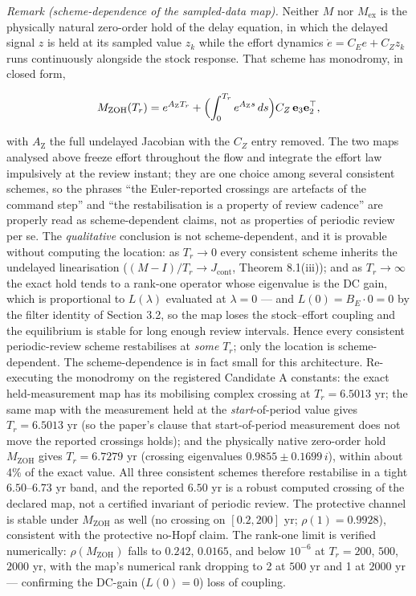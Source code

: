 \documentclass[11pt]{article}
\begin{document}
\emph{Remark (scheme-dependence of the sampled-data map).} Neither \(M\)
nor \(M_{\mathrm{ex}}\) is the physically natural zero-order hold of the
delay equation, in which the delayed signal \(z\) is held at its sampled
value \(z_k\) while the effort dynamics \(\dot e = C_E e + C_Z z_k\)
runs continuously alongside the stock response. That scheme has
monodromy, in closed form,

\[M_{\mathrm{ZOH}}(T_r) = e^{A_{\mathrm{Z}} T_r} + \Bigl( \int_0^{T_r} e^{A_{\mathrm{Z}} s}\, ds \Bigr) C_Z\, \mathbf e_3 \mathbf e_2^\top,\]

with \(A_{\mathrm{Z}}\) the full undelayed Jacobian with the \(C_Z\)
entry removed. The two maps analysed above freeze effort throughout the
flow and integrate the effort law impulsively at the review instant;
they are one choice among several consistent schemes, so the phrases
``the Euler-reported crossings are artefacts of the command step'' and
``the restabilisation is a property of review cadence'' are properly
read as scheme-dependent claims, not as properties of periodic review
per se. The \emph{qualitative} conclusion is not scheme-dependent, and
it is provable without computing the location: as \(T_r \to 0\) every
consistent scheme inherits the undelayed linearisation
(\((M - I)/T_r \to J_{\mathrm{cont}}\), Theorem 8.1(iii)); and as
\(T_r \to \infty\) the exact hold tends to a rank-one operator whose
eigenvalue is the DC gain, which is proportional to \(L(\lambda)\)
evaluated at \(\lambda = 0\) --- and \(L(0) = B_E \cdot 0 = 0\) by the
filter identity of Section 3.2, so the map loses the stock--effort
coupling and the equilibrium is stable for long enough review intervals.
Hence every consistent periodic-review scheme restabilises at
\emph{some} \(T_r\); only the location is scheme-dependent. The
scheme-dependence is in fact small for this architecture. Re-executing
the monodromy on the registered Candidate A constants: the exact
held-measurement map has its mobilising complex crossing at
\(T_r = 6.5013\) yr; the same map with the measurement held at the
\emph{start}-of-period value gives \(T_r = 6.5013\) yr (so the paper's
clause that start-of-period measurement does not move the reported
crossings holds); and the physically native zero-order hold
\(M_{\mathrm{ZOH}}\) gives \(T_r = 6.7279\) yr (crossing eigenvalues
\(0.9855 \pm 0.1699\,i\)), within about 4\% of the exact value. All
three consistent schemes therefore restabilise in a tight
\(6.50\)--\(6.73\) yr band, and the reported \(6.50\) yr is a robust
computed crossing of the declared map, not a certified invariant of
periodic review. The protective channel is stable under
\(M_{\mathrm{ZOH}}\) as well (no crossing on \([0.2, 200]\) yr;
\(\rho(1) = 0.9928\)), consistent with the protective no-Hopf claim. The
rank-one limit is verified numerically: \(\rho(M_{\mathrm{ZOH}})\) falls
to \(0.242\), \(0.0165\), and below \(10^{-6}\) at \(T_r = 200\),
\(500\), \(2000\) yr, with the map's numerical rank dropping to 2 at
\(500\) yr and 1 at \(2000\) yr --- confirming the DC-gain
(\(L(0) = 0\)) loss of coupling.
\end{document}
